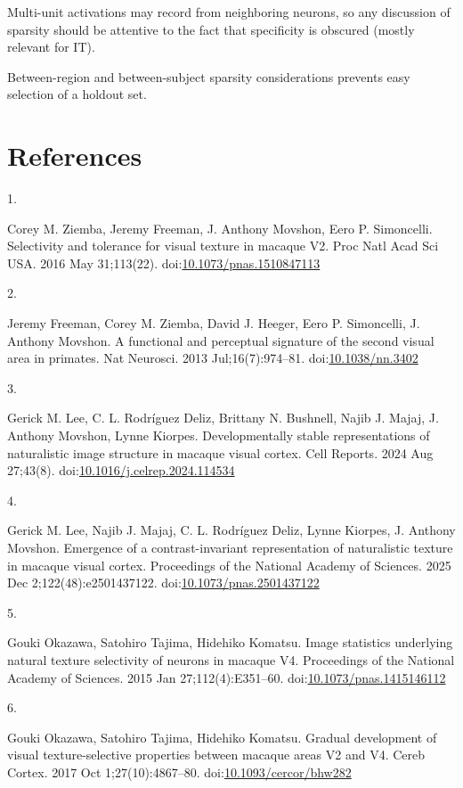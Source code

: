 \documentclass[
  11pt,
  letterpaper,
  DIV=11,
  numbers=noendperiod]{scrartcl}
\newlength{\cslhangindent}
\newlength{\csllabelwidth}
\newenvironment{CSLReferences}[2] %
 {\begin{list}{}{%
  \setlength{\itemindent}{0pt}
  \setlength{\leftmargin}{0pt}
  \setlength{\parsep}{0pt}
  \ifodd #1
   \setlength{\leftmargin}{\cslhangindent}
   \setlength{\itemindent}{-1\cslhangindent}
  \fi
  \setlength{\itemsep}{#2\baselineskip}}}
 {\end{list}}
\newcommand{\CSLLeftMargin}[1]{\parbox[t]{\csllabelwidth}{\strut#1\strut}}
\newcommand{\CSLRightInline}[1]{\parbox[t]{\linewidth - \csllabelwidth}{\strut#1\strut}}
\begin{document}
Multi-unit activations may record from neighboring neurons, so any
discussion of sparsity should be attentive to the fact that specificity
is obscured (mostly relevant for IT).

Between-region and between-subject sparsity considerations prevents easy
selection of a holdout set.

\pagebreak

\section{References}\label{references}

\label{refs}
\begin{CSLReferences}{0}{1}
\CSLLeftMargin{1. }%
\CSLRightInline{Corey M. Ziemba, Jeremy Freeman, J. Anthony Movshon,
Eero P. Simoncelli. Selectivity and tolerance for visual texture in
macaque V2. Proc Natl Acad Sci USA. 2016 May 31;113(22).
doi:\href{https://doi.org/10.1073/pnas.1510847113}{10.1073/pnas.1510847113}}

\CSLLeftMargin{2. }%
\CSLRightInline{Jeremy Freeman, Corey M. Ziemba, David J. Heeger, Eero
P. Simoncelli, J. Anthony Movshon. A functional and perceptual signature
of the second visual area in primates. Nat Neurosci. 2013
Jul;16(7):974--81.
doi:\href{https://doi.org/10.1038/nn.3402}{10.1038/nn.3402}}

\CSLLeftMargin{3. }%
\CSLRightInline{Gerick M. Lee, C. L. Rodríguez Deliz, Brittany N.
Bushnell, Najib J. Majaj, J. Anthony Movshon, Lynne Kiorpes.
Developmentally stable representations of naturalistic image structure
in macaque visual cortex. Cell Reports. 2024 Aug 27;43(8).
doi:\href{https://doi.org/10.1016/j.celrep.2024.114534}{10.1016/j.celrep.2024.114534}}

\CSLLeftMargin{4. }%
\CSLRightInline{Gerick M. Lee, Najib J. Majaj, C. L. Rodríguez Deliz,
Lynne Kiorpes, J. Anthony Movshon. Emergence of a contrast-invariant
representation of naturalistic texture in macaque visual cortex.
Proceedings of the National Academy of Sciences. 2025 Dec
2;122(48):e2501437122.
doi:\href{https://doi.org/10.1073/pnas.2501437122}{10.1073/pnas.2501437122}}

\CSLLeftMargin{5. }%
\CSLRightInline{Gouki Okazawa, Satohiro Tajima, Hidehiko Komatsu. Image
statistics underlying natural texture selectivity of neurons in macaque
V4. Proceedings of the National Academy of Sciences. 2015 Jan
27;112(4):E351--60.
doi:\href{https://doi.org/10.1073/pnas.1415146112}{10.1073/pnas.1415146112}}

\CSLLeftMargin{6. }%
\CSLRightInline{Gouki Okazawa, Satohiro Tajima, Hidehiko Komatsu.
Gradual development of visual texture-selective properties between
macaque areas V2 and V4. Cereb Cortex. 2017 Oct 1;27(10):4867--80.
doi:\href{https://doi.org/10.1093/cercor/bhw282}{10.1093/cercor/bhw282}}

\end{CSLReferences}
\end{document}
